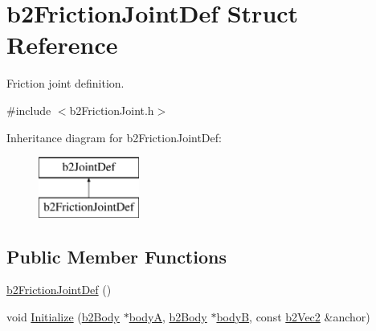 \hypertarget{structb2_friction_joint_def}{}\section{b2\+Friction\+Joint\+Def Struct Reference}
\label{structb2_friction_joint_def}


Friction joint definition.  




{\ttfamily \#include $<$b2\+Friction\+Joint.\+h$>$}

Inheritance diagram for b2\+Friction\+Joint\+Def\+:\begin{figure}[H]
\begin{center}
\leavevmode
\includegraphics[height=2.000000cm]{structb2_friction_joint_def}
\end{center}
\end{figure}
\subsection*{Public Member Functions}
\begin{DoxyCompactItemize}
\item 
\mbox{\hyperlink{structb2_friction_joint_def_a40c1092cc8b3b348cdf2f8d445e835e6}{b2\+Friction\+Joint\+Def}} ()
\item 
void \mbox{\hyperlink{structb2_friction_joint_def_aee104f2aeb34dec4e17e3c52a98f7915}{Initialize}} (\mbox{\hyperlink{classb2_body}{b2\+Body}} $\ast$\mbox{\hyperlink{structb2_joint_def_a8cd54c93da396be75a9788f2c6897f05}{bodyA}}, \mbox{\hyperlink{classb2_body}{b2\+Body}} $\ast$\mbox{\hyperlink{structb2_joint_def_aa4f4dee2fbcd12187b19506b60e68e3d}{bodyB}}, const \mbox{\hyperlink{structb2_vec2}{b2\+Vec2}} \&anchor)
\end{DoxyCompactItemize}
